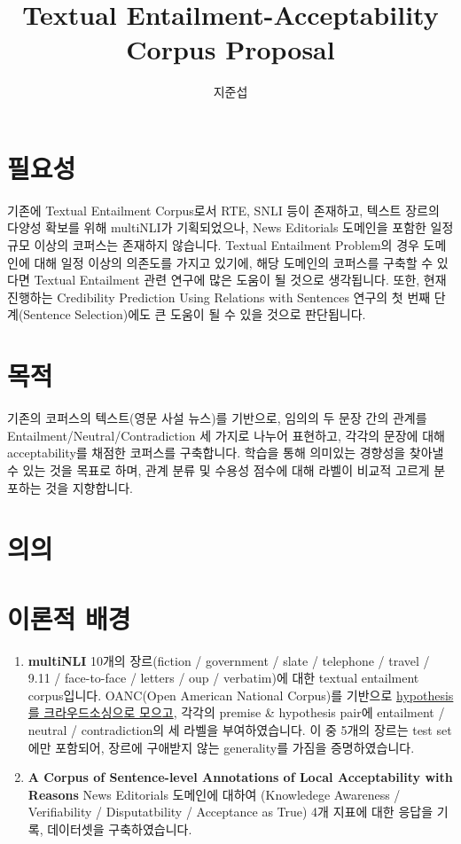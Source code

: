 \documentclass{article}
\author{지준섭}
\title{Textual Entailment-Acceptability Corpus Proposal}
\begin{document}
  
\maketitle

\section{필요성}
기존에 Textual Entailment Corpus로서 RTE, SNLI\cite{snli:emnlp2015} 등이 존재하고,
텍스트 장르의 다양성 확보를 위해 multiNLI\cite{multinli}가 기획되었으나,
News Editorials 도메인을 포함한 일정 규모 이상의 코퍼스는 존재하지 않습니다.
Textual Entailment Problem의 경우 도메인에 대해 일정 이상의 의존도를 가지고 있기에,
해당 도메인의 코퍼스를 구축할 수 있다면 Textual Entailment 관련 연구에
많은 도움이 될 것으로 생각됩니다.
또한, 현재 진행하는 Credibility Prediction Using Relations with Sentences 연구의
첫 번째 단계(Sentence Selection)에도 큰 도움이 될 수 있을 것으로 판단됩니다.

\section{목적}
기존의 코퍼스의 텍스트(영문 사설 뉴스)를 기반으로, 임의의 두 문장 간의 관계를
Entailment/Neutral/Contradiction 세 가지로 나누어 표현하고,
각각의 문장에 대해 acceptability를 채점한 코퍼스를 구축합니다.
학습을 통해 의미있는 경향성을 찾아낼 수 있는 것을 목표로 하며,
관계 분류 및 수용성 점수에 대해 라벨이 비교적 고르게 분포하는 것을 지향합니다.

\section{의의}

\section{이론적 배경}
\begin{enumerate}
  \item \textbf{multiNLI}
    10개의 장르(fiction / government / slate / telephone / travel
    / 9.11 / face-to-face / letters / oup / verbatim)에 대한
    textual entailment corpus입니다. OANC(Open American National Corpus)를
    기반으로 \underline{hypothesis를 크라우드소싱으로 모으고},
    각각의 premise \& hypothesis pair에
    entailment / neutral / contradiction의 세 라벨을 부여하였습니다.
    이 중 5개의 장르는 test set에만 포함되어,
    장르에 구애받지 않는 generality를 가짐을 증명하였습니다.
  \item \textbf{A Corpus of Sentence-level Annotations of
    Local Acceptability with Reasons}
    News Editorials 도메인에 대하여 
    (Knowledege Awareness / Verifiability / Disputatbility / Acceptance as True)
    4개 지표에 대한 응답을 기록, 데이터셋을 구축하였습니다.
\end{enumerate}
\end{document}
